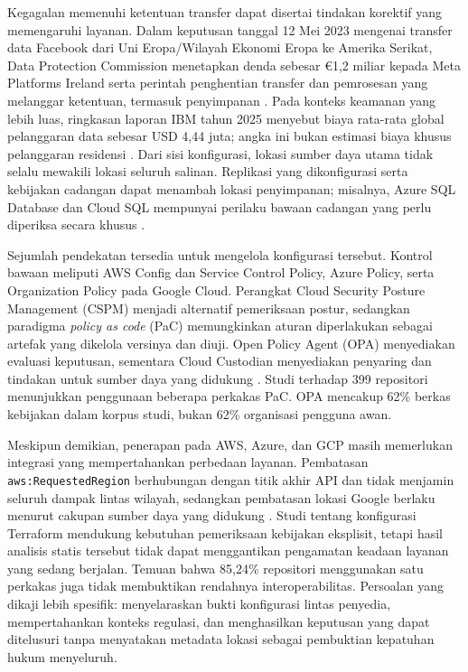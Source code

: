 Kegagalan memenuhi ketentuan transfer dapat disertai tindakan korektif yang memengaruhi layanan. Dalam keputusan tanggal 12 Mei 2023 mengenai transfer data Facebook dari Uni Eropa/Wilayah Ekonomi Eropa ke Amerika Serikat, Data Protection Commission menetapkan denda sebesar €1,2 miliar kepada Meta Platforms Ireland serta perintah penghentian transfer dan pemrosesan yang melanggar ketentuan, termasuk penyimpanan \autocite{dpc2023}. Pada konteks keamanan yang lebih luas, ringkasan laporan IBM tahun 2025 menyebut biaya rata-rata global pelanggaran data sebesar USD 4,44 juta; angka ini bukan estimasi biaya khusus pelanggaran residensi \autocite{ibm2025summary}. Dari sisi konfigurasi, lokasi sumber daya utama tidak selalu mewakili lokasi seluruh salinan. Replikasi yang dikonfigurasi serta kebijakan cadangan dapat menambah lokasi penyimpanan; misalnya, Azure SQL Database dan Cloud SQL mempunyai perilaku bawaan cadangan yang perlu diperiksa secara khusus \autocite{b2c_azureSqlBackup,b2c_gcpSqlBackups}.

Sejumlah pendekatan tersedia untuk mengelola konfigurasi tersebut. Kontrol bawaan meliputi AWS\label{abbr:aws} Config dan Service Control Policy, Azure Policy, serta Organization Policy pada Google Cloud. Perangkat Cloud Security Posture Management (CSPM\label{abbr:cspm}) menjadi alternatif pemeriksaan postur, sedangkan paradigma \textit{policy as code} (PaC\label{abbr:pac}) memungkinkan aturan diperlakukan sebagai artefak yang dikelola versinya dan diuji. Open Policy Agent (OPA\label{abbr:opa}) menyediakan evaluasi keputusan, sementara Cloud Custodian menyediakan penyaring dan tindakan untuk sumber daya yang didukung \autocite{b2c_opaOverview,b2c_custodianOverview}. Studi \textcite{foalem2026} terhadap 399 repositori menunjukkan penggunaan beberapa perkakas PaC. OPA mencakup 62\% berkas kebijakan dalam korpus studi, bukan 62\% organisasi pengguna awan.

Meskipun demikian, penerapan pada AWS, Azure, dan GCP\label{abbr:gcp} masih memerlukan integrasi yang mempertahankan perbedaan layanan. Pembatasan \texttt{aws:\allowbreak RequestedRegion} berhubungan dengan titik akhir API dan tidak menjamin seluruh dampak lintas wilayah, sedangkan pembatasan lokasi Google berlaku menurut cakupan sumber daya yang didukung \autocite{b2c_awsRegionCondition,b2c_gcpLocationConstraint}. Studi \textcite{verdet2025} tentang konfigurasi Terraform mendukung kebutuhan pemeriksaan kebijakan eksplisit, tetapi hasil analisis statis tersebut tidak dapat menggantikan pengamatan keadaan layanan yang sedang berjalan. Temuan \textcite{foalem2026} bahwa 85,24\% repositori menggunakan satu perkakas juga tidak membuktikan rendahnya interoperabilitas. Persoalan yang dikaji lebih spesifik: menyelaraskan bukti konfigurasi lintas penyedia, mempertahankan konteks regulasi, dan menghasilkan keputusan yang dapat ditelusuri tanpa menyatakan metadata lokasi sebagai pembuktian kepatuhan hukum menyeluruh.

